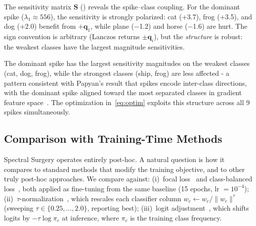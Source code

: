 \documentclass[11pt,a4paper]{article}
\newcommand{\mat}[1]{\bm{#1}}
\newcommand{\vect}[1]{\bm{#1}}
\begin{document}
The sensitivity matrix $\mat{S}$ ()
reveals the spike--class coupling. For the dominant spike
($\lambda_1 \approx 556$), the sensitivity is strongly polarized: cat
(+3.7), frog (+3.5), and dog (+2.0) benefit from $+\vect{q}_1$,
while plane ($-$1.2) and horse ($-$1.6) are hurt. The sign convention
is arbitrary (Lanczos returns $\pm\vect{q}_i$), but the
\emph{structure} is robust: the weakest classes have the largest
magnitude sensitivities.

The dominant spike has the largest sensitivity magnitudes on the
weakest classes (cat, dog, frog), while the strongest classes
(ship, frog) are less affected - a pattern consistent with Papyan's
result that spikes encode inter-class directions, with the dominant
spike aligned toward the most separated classes in gradient feature
space~\cite{papyan2020}. The optimization in~\eqref{eq:optim}
exploits this structure across all 9 spikes simultaneously.

\subsection{Comparison with Training-Time Methods}
\label{sec:comparison}

Spectral Surgery operates entirely post-hoc. A natural question is how
it compares to standard methods that modify the training objective, and
to other truly post-hoc approaches. We compare against:
(i)~focal loss~\cite{lin2017} and class-balanced loss~\cite{cui2019},
both applied as fine-tuning from the same baseline (15 epochs,
lr $= 10^{-4}$);
(ii)~$\tau$-normalization~\cite{kang2020}, which rescales each
classifier column $w_c \leftarrow w_c / \|w_c\|^\tau$ (sweeping
$\tau \in \{0.25,\ldots,2.0\}$, reporting best);
(iii)~logit adjustment~\cite{menon2021}, which shifts logits by
$-\tau\log\pi_c$ at inference, where $\pi_c$ is the training class
frequency.
\end{document}
